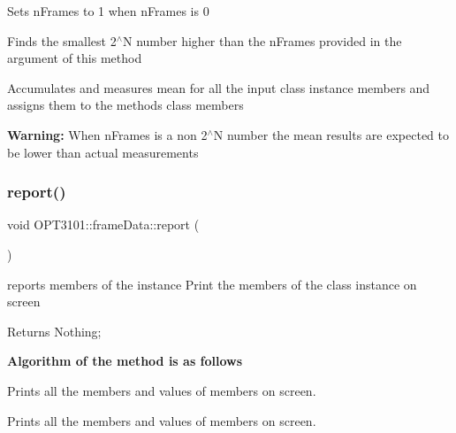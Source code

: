 \begin{DoxyItemize}
\item Sets n\+Frames to 1 when n\+Frames is 0
\item Finds the smallest 2$^\wedge$N number higher than the n\+Frames provided in the argument of this method
\item Accumulates and measures mean for all the input class instance members and assigns them to the method\textquotesingle{}s class members ~\newline

\item {\bfseries Warning\+:} When n\+Frames is a non 2$^\wedge$N number the mean results are expected to be lower than actual measurements 
\end{DoxyItemize}\mbox{\label{class_o_p_t3101_1_1frame_data_ad20da1bc47279244384f59c2f3b33d61}} 
\subsubsection{\texorpdfstring{report()}{report()}}
{\footnotesize\ttfamily void O\+P\+T3101\+::frame\+Data\+::report (\begin{DoxyParamCaption}{ }\end{DoxyParamCaption})}



reports members of the instance Print the members of the class instance on screen 

\begin{DoxyReturn}{Returns}
Nothing; 
\end{DoxyReturn}
{\bfseries Algorithm of the method is as follows}


\begin{DoxyItemize}
\item Prints all the members and values of members on screen. ~\newline

\item Prints all the members and values of members on screen. 
\end{DoxyItemize}\mbox{\label{class_o_p_t3101_1_1frame_data_a8ece44f845216c8d0cae378932c854e6}} 

